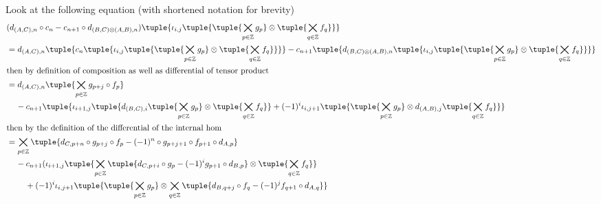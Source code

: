 \begin{remark}
\begin{enumerate}
{            Look at the following equation (with shortened notation for brevity) 
            \begin{align*}
                &( d_{(A, C), n} \circ c_n - c_{n + 1} \circ d_{(B, C) \otimes (A, B), n} )\tuple{ \iota_{i, j} \tuple{\tuple{ \bigtimes_{p \in \Zb} g_p } \otimes \tuple{ \bigtimes_{q \in \Zb} f_q } } } \\
                &= d_{(A, C), n}\tuple{c_n \tuple{ \iota_{i, j} \tuple{\tuple{ \bigtimes_{p \in \Zb} g_p } \otimes \tuple{ \bigtimes_{q \in \Zb} f_q } } }} - c_{n + 1} \tuple{ d_{(B, C) \otimes (A, B), n}\tuple{ \iota_{i, j} \tuple{\tuple{ \bigtimes_{p \in \Zb} g_p } \otimes \tuple{ \bigtimes_{q \in \Zb} f_q } } } } \\
                \intertext{then by definition of composition as well as differential of tensor product}
                &= d_{(A, C), n}\tuple{
                    \bigtimes_{p \in \Zb} g_{p + j} \circ f_p 
                } \\
                &\hspace{0.4cm} - c_{n + 1} \tuple{
                    \iota_{i + 1, j}\tuple{
                        d_{(B, C), i}\tuple{ \bigtimes_{p \in \Zb} g_p } \otimes \tuple{ \bigtimes_{q \in \Zb} f_q }
                    } + (-1)^i \iota_{i, j + 1}\tuple{
                        \tuple{ \bigtimes_{p \in \Zb} g_p } \otimes d_{(A, B), j} \tuple{ \bigtimes_{q \in \Zb} f_q }
                    }
                } \\
                \intertext{then by the definition of the differential of the internal hom}
                &= \bigtimes_{p \in \Zb}\tuple{
                    d_{C, p + n} \circ g_{p + j} \circ f_p - (-1)^n \circ g_{p + j + 1} \circ f_{p + 1} \circ d_{A, p}
                } \\
                &\hspace{0.4cm} - c_{n + 1} (
                    \iota_{i + 1, j}\tuple{              
                        \bigtimes_{p \in \Zb} \tuple{
                            d_{C, p + i} \circ g_p - (-1)^i g_{p + 1} \circ d_{B, p}
                        } \otimes \tuple{ \bigtimes_{q \in \Zb} f_q }
                    } \\
                    &\hspace{0.8cm}+ (-1)^i \iota_{i, j + 1}\tuple{
                        \tuple{ \bigtimes_{p \in \Zb} g_p } \otimes \bigtimes_{q \in \Zb}\tuple{
                            d_{B, q + j} \circ f_q - (-1)^j f_{q + 1} \circ d_{A, q}
                        }
                    }

\end{align*}}
\end{enumerate}
\end{remark}
